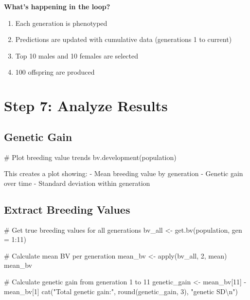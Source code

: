 \documentclass[
  letterpaper,
]{book}
\newenvironment{Shaded}{\begin{snugshade}}{\end{snugshade}}
\newcommand{\AttributeTok}[1]{\textcolor[rgb]{0.40,0.45,0.13}{#1}}
\newcommand{\CommentTok}[1]{\textcolor[rgb]{0.37,0.37,0.37}{#1}}
\newcommand{\DecValTok}[1]{\textcolor[rgb]{0.68,0.00,0.00}{#1}}
\newcommand{\FunctionTok}[1]{\textcolor[rgb]{0.28,0.35,0.67}{#1}}
\newcommand{\NormalTok}[1]{\textcolor[rgb]{0.00,0.23,0.31}{#1}}
\newcommand{\OtherTok}[1]{\textcolor[rgb]{0.00,0.23,0.31}{#1}}
\newcommand{\SpecialCharTok}[1]{\textcolor[rgb]{0.37,0.37,0.37}{#1}}
\newcommand{\StringTok}[1]{\textcolor[rgb]{0.13,0.47,0.30}{#1}}
\providecommand{\tightlist}{%
  \setlength{\itemsep}{0pt}\setlength{\parskip}{0pt}}
\begin{document}
\textbf{What's happening in the loop?}

\begin{enumerate}
\def\labelenumi{\arabic{enumi}.}
\tightlist
\item
  Each generation is phenotyped
\item
  Predictions are updated with cumulative data (generations 1 to
  current)
\item
  Top 10 males and 10 females are selected
\item
  100 offspring are produced
\end{enumerate}

\section{Step 7: Analyze Results}\label{sec-analyze}

\subsection{Genetic Gain}\label{genetic-gain}

\begin{Shaded}
\begin{Highlighting}[]
\CommentTok{\# Plot breeding value trends}
\FunctionTok{bv.development}\NormalTok{(population)}
\end{Highlighting}
\end{Shaded}

This creates a plot showing: - Mean breeding value by generation -
Genetic gain over time - Standard deviation within generation

\subsection{Extract Breeding Values}\label{extract-breeding-values}

\begin{Shaded}
\begin{Highlighting}[]
\CommentTok{\# Get true breeding values for all generations}
\NormalTok{bv\_all }\OtherTok{\textless{}{-}} \FunctionTok{get.bv}\NormalTok{(population, }\AttributeTok{gen =} \DecValTok{1}\SpecialCharTok{:}\DecValTok{11}\NormalTok{)}

\CommentTok{\# Calculate mean BV per generation}
\NormalTok{mean\_bv }\OtherTok{\textless{}{-}} \FunctionTok{apply}\NormalTok{(bv\_all, }\DecValTok{2}\NormalTok{, mean)}
\NormalTok{mean\_bv}

\CommentTok{\# Calculate genetic gain from generation 1 to 11}
\NormalTok{genetic\_gain }\OtherTok{\textless{}{-}}\NormalTok{ mean\_bv[}\DecValTok{11}\NormalTok{] }\SpecialCharTok{{-}}\NormalTok{ mean\_bv[}\DecValTok{1}\NormalTok{]}
\FunctionTok{cat}\NormalTok{(}\StringTok{"Total genetic gain:"}\NormalTok{, }\FunctionTok{round}\NormalTok{(genetic\_gain, }\DecValTok{3}\NormalTok{), }\StringTok{"genetic SD}\SpecialCharTok{\textbackslash{}n}\StringTok{"}\NormalTok{)}
\end{Highlighting}
\end{Shaded}
\end{document}
